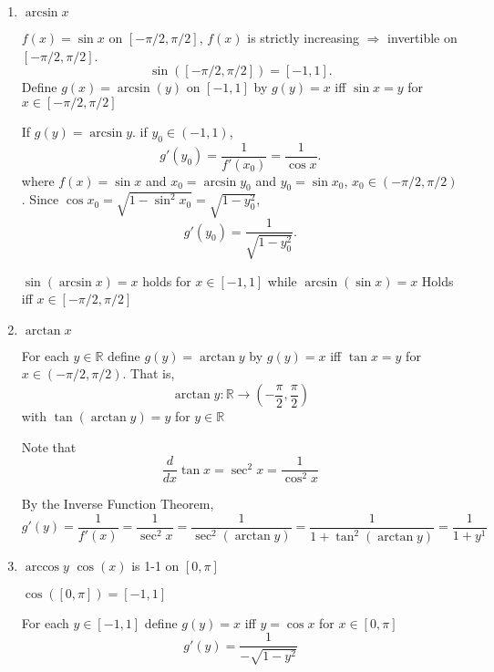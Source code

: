 \begin{exmp}\leavevmode

\begin{enumerate}
\item $\arcsin x$

$f(x) = \sin x$ on $[-\pi / 2,\pi / 2]$, $f(x)$ is strictly increasing $\Rightarrow$ invertible on $[-\pi / 2,\pi / 2]$.
\[\sin ([-\pi / 2,\pi / 2]) = [-1,1].\] 
Define $g(x) = \arcsin(y)$ on $[-1, 1]$ by $g(y) = x$ iff $\sin x = y$ for $x \in [-\pi / 2,\pi / 2]$

If $g(y) = \arcsin y$. if $y_0 \in (-1,1)$, \[g'(y_0) = \frac{1}{f'(x_0)} = \frac{1}{\cos x}.\] where $f(x) = \sin x$ and $x_0 = \arcsin y_0$ and $y_0 = \sin x_0$, $x_0 \in (-\pi / 2,\pi / 2)$. Since $\cos x_0 = \sqrt{1-\sin^2 x_0}= \sqrt{1-y_0^2}$, \[g'(y_0) = \frac{1}{\sqrt{1-y_0^2}}.\]

\begin{note}
$\sin (\arcsin x )= x$ holds for $x\in [-1,1]$ while $\arcsin(\sin x)=x$ Holds iff $x \in [-\pi / 2,\pi/2]$
\end{note}

\item $\arctan x$

For each $y\in \mathbb{R}$ define $g(y)=\arctan y$ by $ g(y)= x$ iff $\tan x = y$ for $x \in (-\pi / 2,\pi / 2)$. That is, \[\arctan y: \mathbb{R}\to (-\frac{\pi}{2},\frac{\pi}{2})\] with $\tan (\arctan y) = y$ for $ y \in \mathbb{R}$

Note that \[\frac{d}{dx} \tan x =\sec^2 x = \frac{1}{\cos^2 x}\]

By the Inverse Function Theorem, \[g'(y) = \frac{1}{f'(x)} = \frac{1}{\sec^2 x} = \frac{1}{\sec^2 (\arctan y)} = \frac{1}{1+\tan^2 (\arctan y)} = \frac{1}{1+y^1}\]


\item $\arccos y$
$\cos(x)$ is 1-1 on $[0,\pi]$

\begin{note}
    $\cos([0,\pi]) = [-1, 1]$
    
    For each $ y \in [-1,1]$ define $g(y) = x$ iff $y = \cos x$ for $x \in [0, \pi]$
    \[g'(y) = \frac{1}{-\sqrt{1-y^2}}\]
\end{note}
\end{enumerate}
\end{exmp}